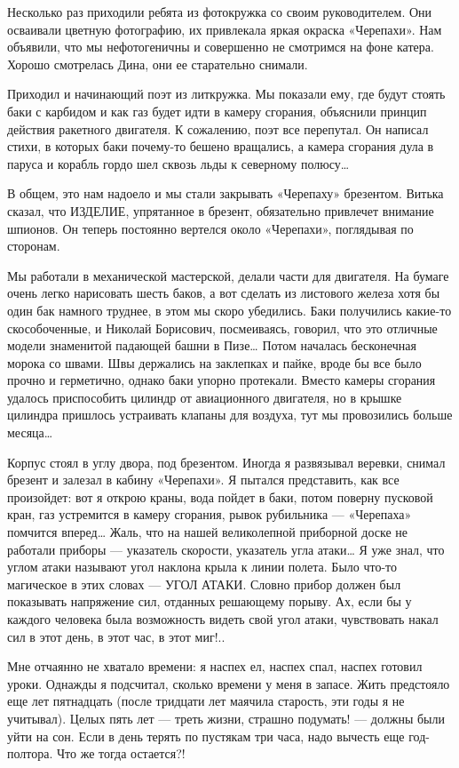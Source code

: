 Несколько раз приходили ребята из  фотокружка со своим руководителем.  Они
осваивали цветную фотографию, их  привлекала яркая окраска «Черепахи».  Нам
объявили, что мы нефотогеничны и  совершенно не смотримся на фоне  катера.
Хорошо смотрелась Дина, они ее старательно снимали.

Приходил и начинающий поэт из литкружка. Мы показали ему, где будут стоять
баки с карбидом и как газ будет идти в камеру сгорания, объяснили  принцип
действия ракетного двигателя. К сожалению, поэт все перепутал. Он  написал
стихи, в которых баки почему-то бешено вращались, а камера сгорания дула  в
паруса и корабль гордо шел сквозь льды к северному полюсу…

В общем, это нам надоело и мы стали закрывать «Черепаху» брезентом. Витька
сказал, что ИЗДЕЛИЕ, упрятанное в брезент, обязательно привлечет  внимание
шпионов. Он  теперь постоянно  вертелся  около «Черепахи»,  поглядывая  по
сторонам.

Мы работали  в механической  мастерской, делали  части для  двигателя.  На
бумаге очень  легко нарисовать  шесть баков,  а вот  сделать из  листового
железа хотя бы один бак намного  труднее, в этом мы скоро убедились.  Баки
получились  какие-то  скособоченные,  и  Николай  Борисович,  посмеиваясь,
говорил, что это отличные модели  знаменитой падающей башни в Пизе…  Потом
началась бесконечная морока со швами. Швы держались на заклепках и  пайке,
вроде бы  все было  прочно  и герметично,  однако баки  упорно  протекали.
Вместо  камеры  сгорания  удалось  приспособить  цилиндр  от  авиационного
двигателя, но в крышке цилиндра  пришлось устраивать клапаны для  воздуха,
тут мы провозились больше месяца…

Корпус стоял в  углу двора,  под брезентом. Иногда  я развязывал  веревки,
снимал брезент и залезал в  кабину «Черепахи». Я пытался представить,  как
все произойдет: вот  я открою  краны, вода  пойдет в  баки, потом  поверну
пусковой кран,  газ  устремится  в камеру  сгорания,  рывок  рубильника  —
«Черепаха» помчится  вперед… Жаль,  что  на нашей  великолепной  приборной
доске не работали приборы  — указатель скорости,  указатель угла атаки…  Я
уже знал, что углом атаки называют угол наклона крыла к линии полета. Было
что-то магическое в  этих словах —  УГОЛ АТАКИ. Словно  прибор должен  был
показывать напряжение  сил,  отданных  решающему порыву.  Ах,  если  бы  у
каждого человека  была возможность  видеть  свой угол  атаки,  чувствовать
накал сил в этот день, в этот час, в этот миг!..

Мне отчаянно не хватало времени: я наспех ел, наспех спал, наспех  готовил
уроки. Однажды  я  подсчитал,  сколько  времени  у  меня  в  запасе.  Жить
предстояло еще лет  пятнадцать (после тридцати  лет маячила старость,  эти
годы я не  учитывал). Целых пять  лет — треть  жизни, страшно подумать!  —
должны были уйти на  сон. Если в  день терять по  пустякам три часа,  надо
вычесть еще год-полтора. Что же тогда остается?!

